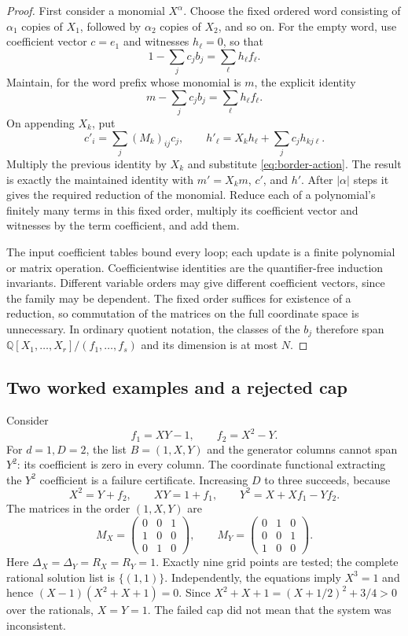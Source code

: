 \begin{proof}
First consider a monomial $X^\alpha$. Choose the fixed ordered word
consisting of $\alpha_1$ copies of $X_1$, followed by $\alpha_2$ copies
of $X_2$, and so on. For the empty word, use coefficient vector $c=e_1$
and witnesses $h_\ell=0$, so that
\[
                  1-\sum_j c_jb_j=\sum_\ell h_\ell f_\ell.
\]
Maintain, for the word prefix whose monomial is $m$, the explicit identity
\[
                  m-\sum_j c_jb_j=\sum_\ell h_\ell f_\ell.
\]
On appending $X_k$, put
\[
 c'_i=\sum_j(M_k)_{ij}c_j,\qquad
 h'_\ell=X_kh_\ell+\sum_j c_jh_{kj\ell}.
\]
Multiply the previous identity by $X_k$ and substitute
\eqref{eq:border-action}. The result is exactly the maintained identity
with $m'=X_km$, $c'$, and $h'$. After $|\alpha|$ steps it gives the
required reduction of the monomial. Reduce each of a polynomial's
finitely many terms in this fixed order, multiply its coefficient vector
and witnesses by the term coefficient, and add them.

The input coefficient tables bound every loop; each update is a finite
polynomial or matrix operation. Coefficientwise identities are the
quantifier-free induction invariants. Different variable orders may give
different coefficient vectors, since the family may be dependent. The
fixed order suffices for existence of a reduction, so commutation of the
matrices on the full coordinate space is unnecessary. In ordinary
quotient notation, the classes of the $b_j$ therefore span
$\mathbb Q[X_1,\ldots,X_r]/(f_1,\ldots,f_s)$ and its dimension is at
most $N$.
\end{proof}

\subsection{Two worked examples and a rejected cap}

Consider
\[
 f_1=XY-1,\qquad f_2=X^2-Y.
\]
For $d=1,D=2$, the list $B=(1,X,Y)$ and the generator columns cannot
span $Y^2$: its coefficient is zero in every column. The coordinate
functional extracting the $Y^2$ coefficient is a failure certificate.
Increasing $D$ to three succeeds, because
\[
       X^2=Y+f_2,\qquad XY=1+f_1,
       \qquad Y^2=X+Xf_1-Yf_2.
\]
The matrices in the order $(1,X,Y)$ are
\[
 M_X=\begin{pmatrix}0&0&1\\1&0&0\\0&1&0\end{pmatrix},
 \qquad
 M_Y=\begin{pmatrix}0&1&0\\0&0&1\\1&0&0\end{pmatrix}.
\]
Here $\Delta_X=\Delta_Y=R_X=R_Y=1$.
Exactly nine grid points are tested; the complete rational solution list
is $\{(1,1)\}$. Independently, the equations imply $X^3=1$ and hence
$(X-1)(X^2+X+1)=0$. Since
$X^2+X+1=(X+1/2)^2+3/4>0$ over the rationals, $X=Y=1$.
The failed cap did not mean that the system was inconsistent.

